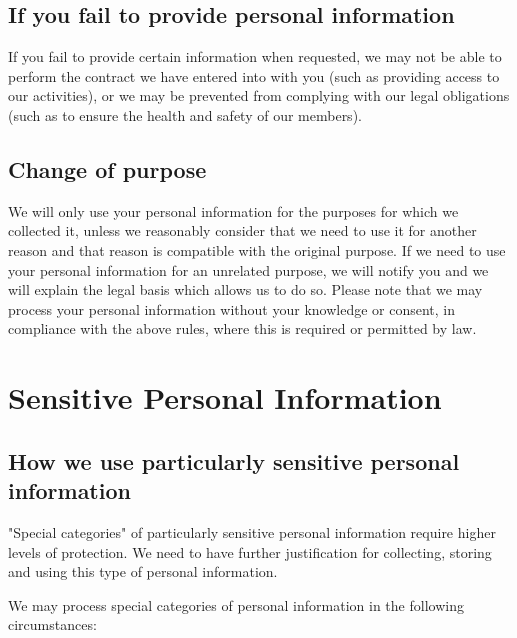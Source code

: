\documentclass[12pt]{article}
\begin{document}
\subsection{If you fail to provide personal information}

If you fail to provide certain information when requested, we may not be able to perform the contract we have entered into with you (such as providing access to our activities), or we may be prevented from complying with our legal obligations (such as to ensure the health and safety of our members).


\subsection{Change of purpose}

We will only use your personal information for the purposes for which we collected it, unless we reasonably consider that we need to use it for another reason and that reason is compatible with the original purpose. If we need to use your personal information for an unrelated purpose, we will notify you and we will explain the legal basis which allows us to do so. 
Please note that we may process your personal information without your knowledge or consent, in compliance with the above rules, where this is required or permitted by law.

\section{Sensitive Personal Information}

\subsection{How we use particularly sensitive personal information}

"Special categories" of particularly sensitive personal information require higher levels of protection. We need to have further justification for collecting, storing and using this type of personal information. 

We may process special categories of personal information in the following circumstances:
\end{document}
